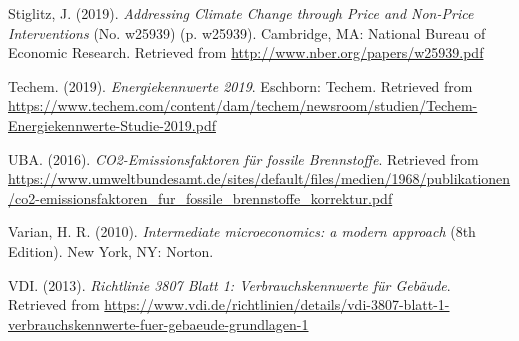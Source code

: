 \documentclass[12pt,twoside]{reedthesis}
\newlength{\cslhangindent}
\newenvironment{CSLReferences}[2] %
 {%
  \setlength{\parindent}{0pt}
  \ifodd #1 \everypar{\setlength{\hangindent}{\cslhangindent}}\ignorespaces\fi
  \ifnum #2 > 0
  \setlength{\parskip}{#2\baselineskip}
  \fi
 }%
 {}
\begin{document}
\begin{CSLReferences}{1}{0}
\leavevmode{}%
Stiglitz, J. (2019). \emph{Addressing Climate Change through Price and Non-Price Interventions} (No. w25939) (p. w25939). Cambridge, MA: National Bureau of Economic Research. Retrieved from \url{http://www.nber.org/papers/w25939.pdf}

\leavevmode{}%
Techem. (2019). \emph{Energiekennwerte 2019}. Eschborn: Techem. Retrieved from \url{https://www.techem.com/content/dam/techem/newsroom/studien/Techem-Energiekennwerte-Studie-2019.pdf}

\leavevmode{}%
UBA. (2016). \emph{CO2-Emissionsfaktoren für fossile Brennstoffe}. Retrieved from \url{https://www.umweltbundesamt.de/sites/default/files/medien/1968/publikationen/co2-emissionsfaktoren_fur_fossile_brennstoffe_korrektur.pdf}

\leavevmode{}%
Varian, H. R. (2010). \emph{Intermediate microeconomics: a modern approach} (8th Edition). New York, NY: Norton.

\leavevmode{}%
VDI. (2013). \emph{Richtlinie 3807 Blatt 1: Verbrauchskennwerte für Gebäude}. Retrieved from \url{https://www.vdi.de/richtlinien/details/vdi-3807-blatt-1-verbrauchskennwerte-fuer-gebaeude-grundlagen-1}

\end{CSLReferences}

\end{document}
